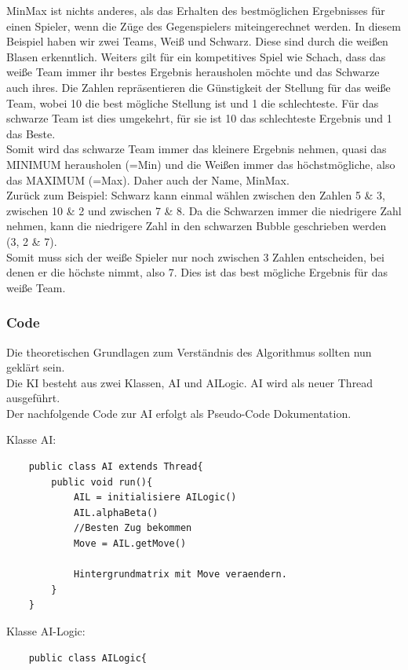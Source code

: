 \documentclass[12pt,a4paper]{article}
\begin{document}
{MinMax ist nichts anderes, als das Erhalten des bestmöglichen Ergebnisses für einen Spieler, wenn die Züge des Gegenspielers miteingerechnet werden. In diesem Beispiel haben wir zwei Teams, Weiß und Schwarz. Diese sind durch die weißen Blasen erkenntlich. Weiters gilt für ein kompetitives Spiel wie Schach, dass das weiße Team immer ihr bestes Ergebnis herausholen möchte und das Schwarze auch ihres. Die Zahlen repräsentieren die Günstigkeit der Stellung für das weiße Team, wobei 10 die best mögliche Stellung ist und 1 die schlechteste. Für das schwarze Team ist dies umgekehrt, für sie ist 10 das schlechteste Ergebnis und 1 das Beste. \\
Somit wird das schwarze Team immer das kleinere Ergebnis nehmen, quasi das MINIMUM herausholen (=Min) und die Weißen immer das höchstmögliche, also das MAXIMUM (=Max). Daher auch der Name, MinMax. \\
Zurück zum Beispiel: Schwarz kann einmal wählen zwischen den Zahlen 5 \& 3, zwischen 10 \& 2 und zwischen 7 \& 8. Da die Schwarzen immer die niedrigere Zahl nehmen, kann die niedrigere Zahl in den schwarzen Bubble geschrieben werden (3, 2 \& 7). \\
Somit muss sich der weiße Spieler nur noch zwischen 3 Zahlen entscheiden, bei denen er die höchste nimmt, also 7. Dies ist das best mögliche Ergebnis für das weiße Team.

\subsubsection{Code}
\label{SUBSUBSEC:AICODE}

Die theoretischen Grundlagen zum Verständnis des Algorithmus sollten nun geklärt sein.\\
Die KI besteht aus zwei Klassen, AI und AILogic. AI wird als neuer Thread ausgeführt. \\
Der nachfolgende Code zur AI erfolgt als Pseudo-Code Dokumentation.


Klasse AI:

\lstset{language=Java}
\begin{lstlisting}
	public class AI extends Thread{
		public void run(){
			AIL = initialisiere AILogic()
			AIL.alphaBeta()
			//Besten Zug bekommen
			Move = AIL.getMove()
			
			Hintergrundmatrix mit Move veraendern.
		}
	}	
\end{lstlisting}

Klasse AI-Logic:
\lstset{language=Java}
\begin{lstlisting}
	public class AILogic{
	

\end{lstlisting}}
\end{document}
